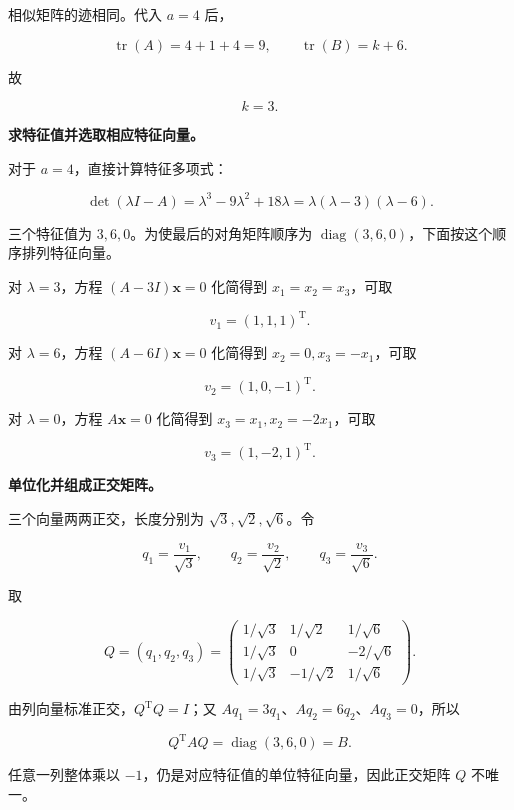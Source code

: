 \documentclass[UTF8,11pt,fontset=windows]{ctexart}
\begin{document}
相似矩阵的迹相同。代入 $a=4$ 后，

$$
\operatorname{tr}(A)=4+1+4=9,
\qquad \operatorname{tr}(B)=k+6.
$$

故

$$
\boxed{k=3}.
$$

\textbf{求特征值并选取相应特征向量。}

对于 $a=4$，直接计算特征多项式：

$$
\det(\lambda I-A)
=\lambda^3-9\lambda^2+18\lambda
=\lambda(\lambda-3)(\lambda-6).
$$

三个特征值为 $3,6,0$。为使最后的对角矩阵顺序为 $\operatorname{diag}(3,6,0)$，下面按这个顺序排列特征向量。

对 $\lambda=3$，方程 $(A-3I)\boldsymbol x=0$ 化简得到 $x_1=x_2=x_3$，可取

$$
v_1=(1,1,1)^{\mathrm T}.
$$

对 $\lambda=6$，方程 $(A-6I)\boldsymbol x=0$ 化简得到 $x_2=0,x_3=-x_1$，可取

$$
v_2=(1,0,-1)^{\mathrm T}.
$$

对 $\lambda=0$，方程 $A\boldsymbol x=0$ 化简得到 $x_3=x_1,x_2=-2x_1$，可取

$$
v_3=(1,-2,1)^{\mathrm T}.
$$

\textbf{单位化并组成正交矩阵。}

三个向量两两正交，长度分别为 $\sqrt3,\sqrt2,\sqrt6$。令

$$
q_1=\frac{v_1}{\sqrt3},\qquad
q_2=\frac{v_2}{\sqrt2},\qquad
q_3=\frac{v_3}{\sqrt6}.
$$

取

$$
\boxed{Q=(q_1,q_2,q_3)
=\begin{pmatrix}
1/\sqrt3&1/\sqrt2&1/\sqrt6\\
1/\sqrt3&0&-2/\sqrt6\\
1/\sqrt3&-1/\sqrt2&1/\sqrt6
\end{pmatrix}}.
$$

由列向量标准正交，$Q^{\mathrm T}Q=I$；又 $Aq_1=3q_1$、$Aq_2=6q_2$、$Aq_3=0$，所以

$$
\boxed{Q^{\mathrm T}AQ=\operatorname{diag}(3,6,0)=B}.
$$

任意一列整体乘以 $-1$，仍是对应特征值的单位特征向量，因此正交矩阵 $Q$ 不唯一。
\end{document}

